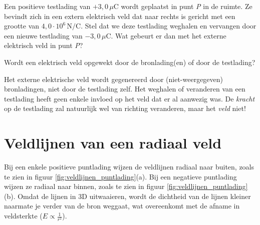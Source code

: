 \documentclass{ximera}
\begin{document}
\begin{question}
    Een positieve testlading van $+3{,}0 \, \mu\mathrm{C}$ wordt geplaatst in punt \textit{P} in de ruimte. Ze bevindt zich in een extern elektrisch veld dat naar rechts is gericht met een grootte van $4{,}0 \cdot 10^{6} \, \mathrm{N/C}$. Stel dat we deze testlading weghalen en vervangen door een nieuwe testlading van $-3{,}0 \, \mu\mathrm{C}$. Wat gebeurt er dan met het externe elektrisch veld in punt \textit{P}?

    \begin{multipleChoice}
    \end{multipleChoice}

    \begin{hint}
        Wordt een elektrisch veld opgewekt door de bronlading(en) of door de testlading?
    \end{hint}

    \begin{solution}\nl
        Het externe elektrische veld wordt gegenereerd door (niet-weergegeven) bronladingen, niet door de testlading zelf. Het weghalen of veranderen van een testlading heeft geen enkele invloed op het veld dat er al aanwezig was. De \textit{kracht} op de testlading zal natuurlijk wel van richting veranderen, maar het \textit{veld} niet!
    \end{solution}
\end{question}

\section{Veldlijnen van een radiaal veld}\label{s:radiaal_veld}

Bij een enkele positieve puntlading wijzen de veldlijnen radiaal naar buiten, zoals te zien in figuur \ref{fig:veldlijnen_puntlading}(a). Bij een negatieve puntlading wijzen ze radiaal naar binnen, zoals te zien in figuur \ref{fig:veldlijnen_puntlading}(b). Omdat de lijnen in 3D uitwaaieren, wordt de dichtheid van de lijnen kleiner naarmate je verder van de bron weggaat, wat overeenkomt met de afname in veldsterkte ($E \propto \frac{1}{r^2}$).
\end{document}
